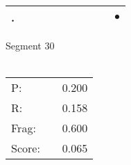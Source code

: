 \documentclass[landscape]{article}
\newcommand{\ssp}{\hspace{2pt}}
\newcommand{\mex}{\cellcolor{g}$\bullet$}
\begin{document}
\begin{tabular}{|l|p{10pt}|p{10pt}|p{10pt}|p{10pt}|p{10pt}|p{10pt}|p{10pt}|p{10pt}|p{10pt}|}
\hline
\ssp \cellcolor{ref8}. \ssp&\hspace{2pt}&\hspace{2pt}&\hspace{2pt}&\hspace{2pt}&\hspace{2pt}&\hspace{2pt}&\hspace{2pt}&\hspace{2pt}&\hspace{2pt}\mex\\
\hline
\end{tabular}

\vspace{6pt}
\noindent Segment 30\\\\
\noindent\begin{tabular}{lm{12pt}r}
\hline
P:&&0.200\\
R:&&0.158\\
Frag:&&0.600\\
Score:&&0.065\\
\end{tabular}

\newpage
\end{document}
